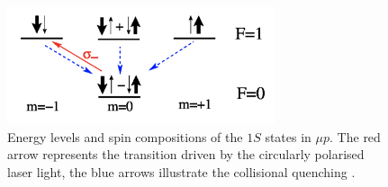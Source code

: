 \documentclass[12pt]{article}
\begin{document}
\begin{figure}[h]
\centering
\includegraphics[width=0.7\textwidth]{img/sublevels}
\caption{Energy levels and spin compositions of the $1S$ states in $\mu{p}$. The red arrow represents the transition driven by the circularly polarised laser light, the blue arrows illustrate the collisional quenching \cite{proposal}.}
\label{fig:sublevels}
\end{figure}
\end{document}
